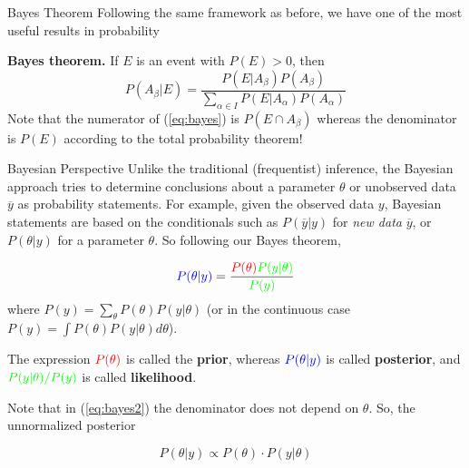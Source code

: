 \documentclass{beamer}
\begin{document}
\begin{frame}{Bayes Theorem}
	Following the same framework as before, we have one of the most useful results in probability
	
	{\bf Bayes theorem.} If $E$ is an event with $P(E)>0$, then
	\begin{equation}
		P(A_\beta |E )= \frac{P(E|A_\beta)P(A_\beta)}{\sum_{\alpha\in I}^{}P(E|A_\alpha)P(A_\alpha)}
		\label{eq:bayes}
	\end{equation}
Note that the numerator of (\ref{eq:bayes}) is $P(E \cap A_\beta)$ whereas the denominator is $P(E)$ according to the total probability theorem!
\end{frame}

\begin{frame}{Bayesian Perspective}
	Unlike the traditional (frequentist) inference, the Bayesian approach tries to determine conclusions about a parameter $\theta$ or unobserved data $\overline{y}$ as probability statements.  For example, given the observed data $y$,  Bayesian statements are based on the conditionals such as  $P(\overline{y}|y)$ for {\it new data} $\overline{y}$, or $P(\theta|y)$ for a parameter $\theta$. So following our Bayes theorem,
	
	\begin{equation}
		{\color{blue}P(\theta| y)}=\frac{{\color{red} P(\theta)} {\color{green}P(y|\theta)}}{\color{green}P(y)}
		\label{eq:bayes2}
	\end{equation}
where $P(y)= \sum_{\theta} P(\theta) P(y|\theta)$ (or in the continuous case $P(y)= \int P(\theta) P(y|\theta) d\theta$). 

The expression  $\color{red} P(\theta)$ is called the {\bf prior}, whereas  $\color{blue} P(\theta|y)$  is called {\bf posterior}, and $\color{green}P(y|\theta)/P(y)$ is called {\bf likelihood}. 

Note that in (\ref{eq:bayes2}) the denominator does not depend on $\theta$.  So, the unnormalized posterior 

\begin{equation*}
	P(\theta|y) \propto P(\theta) \cdot P(y|\theta)
\end{equation*}

 
\end{frame}
\end{document}
